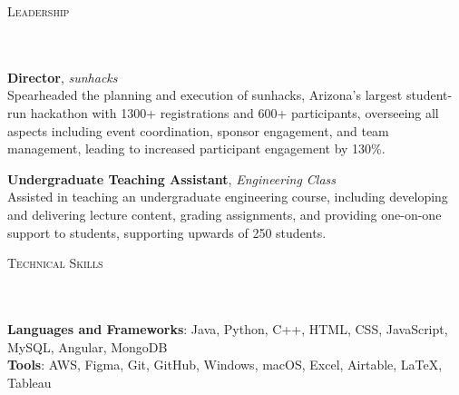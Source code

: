 \documentclass[10pt, letterpaper]{article}
\newcommand{\lineunder} {
    \vspace*{-4pt} \\ %
    \hspace*{-15pt} \hrulefill \\
}
\newcommand{\header}[1] {
    {\textsc{\small #1}}
    \lineunder %
}
\begin{document}
\header{Leadership}
\textbf{Director}, \textit{sunhacks} \\
Spearheaded the planning and execution of sunhacks, Arizona's largest student-run hackathon with 1300+ registrations and 600+ participants, overseeing all aspects including event coordination, sponsor engagement, and team management, leading to increased participant engagement by 130\%.

\textbf{Undergraduate Teaching Assistant}, \textit{Engineering Class} \\
Assisted in teaching an undergraduate engineering course, including developing and delivering lecture content, grading assignments, and providing one-on-one support to students, supporting upwards of 250 students.

\header{Technical Skills}
\textbf{Languages and Frameworks}: Java, Python, C++, HTML, CSS, JavaScript, MySQL, Angular, MongoDB \\
\textbf{Tools}: AWS, Figma, Git, GitHub, Windows, macOS, Excel, Airtable, LaTeX, Tableau
\end{document}
